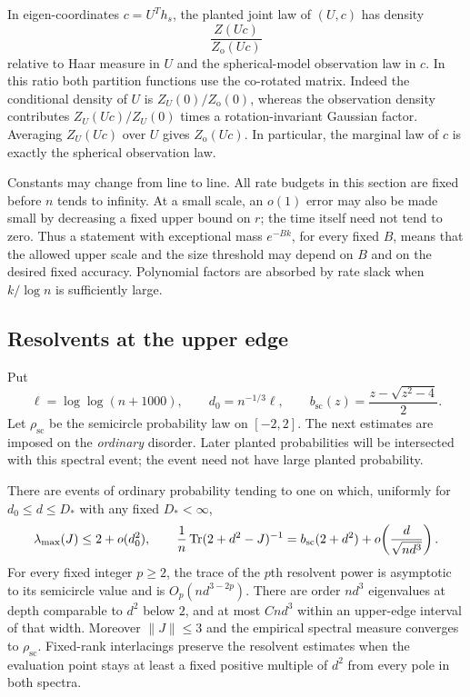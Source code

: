 In eigen-coordinates $c=U^Th_s$, the planted joint
law of $(U,c)$ has density
\[
 \frac{Z(Uc)}{Z_{\mathrm o}(Uc)}
\]
relative to Haar measure in $U$ and the spherical-model observation law
in $c$.  In this ratio both partition functions use the co-rotated
matrix.  Indeed the conditional density of $U$ is
$Z_U(0)/Z_{\mathrm o}(0)$, whereas the observation density contributes
$Z_U(Uc)/Z_U(0)$ times a rotation-invariant Gaussian factor.
Averaging $Z_U(Uc)$ over $U$ gives $Z_{\mathrm o}(Uc)$.  In particular,
the marginal law of $c$ is exactly the spherical observation law.

Constants may change from line to line.  All rate budgets in this
section are fixed before $n$ tends to infinity.  At a small scale, an
$o(1)$ error may also be made small by decreasing a fixed upper bound
on $r$; the time itself need not tend to zero.  Thus a statement with
exceptional mass $e^{-Bk}$, for every fixed $B$, means that the allowed
upper scale and the size threshold may depend on $B$ and on the desired
fixed accuracy.  Polynomial factors are absorbed by rate slack when
$k/\log n$ is sufficiently large.

\subsection{Resolvents at the upper edge}
\label{prof:subsec:spectrum}

Put
\[
 \ell=\log\log(n+1000),\qquad d_0=n^{-1/3}\ell,
 \qquad b_{\mathrm{sc}}(z)=\frac{z-\sqrt{z^2-4}}2.
\]
Let $\rho_{\mathrm{sc}}$ be the semicircle probability law on $[-2,2]$.
The next estimates are imposed on the \emph{ordinary} disorder.  Later
planted probabilities will be intersected with this spectral event;
the event need not have large planted probability.

\begin{lemma}\label{prof:lem:spectrum}
There are events of ordinary probability tending to one on which,
uniformly for $d_0\le d\le D_*$ with any fixed $D_*<\infty$,
\begin{equation}\label{prof:eq1}
 \lambda_{\max}(J)\le 2+o(d_0^2),\qquad
 \frac1n\operatorname{Tr}(2+d^2-J)^{-1}
 =b_{\mathrm{sc}}(2+d^2)
   +o\!\left(\frac{d}{\sqrt{nd^3}}\right).
\end{equation}
For every fixed integer $p\ge2$, the trace of the $p$th resolvent
power is asymptotic to its semicircle value and is $O_p(nd^{3-2p})$.
There are order $nd^3$ eigenvalues at depth comparable to $d^2$ below
$2$, and at most $Cnd^3$ within an upper-edge interval of that width.
Moreover $\|J\|\le3$ and the empirical spectral measure converges to
$\rho_{\mathrm{sc}}$. Fixed-rank interlacings preserve the resolvent
estimates when the evaluation point stays at least a fixed positive
multiple of $d^2$ from every pole in both spectra.
\end{lemma}

